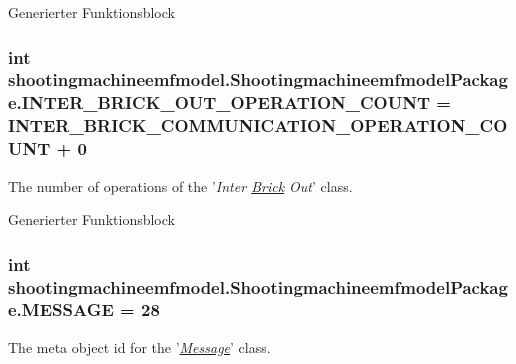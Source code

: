 Generierter Funktionsblock  \hypertarget{interfaceshootingmachineemfmodel_1_1_shootingmachineemfmodel_package_a408e126ab2ebdaf8e342306d21ec4ec9}{
\subsubsection[{I\-N\-T\-E\-R\-\_\-\-B\-R\-I\-C\-K\-\_\-\-O\-U\-T\-\_\-\-O\-P\-E\-R\-A\-T\-I\-O\-N\-\_\-\-C\-O\-U\-N\-T}]{\setlength{\rightskip}{0pt plus 5cm}int shootingmachineemfmodel.\-Shootingmachineemfmodel\-Package.\-I\-N\-T\-E\-R\-\_\-\-B\-R\-I\-C\-K\-\_\-\-O\-U\-T\-\_\-\-O\-P\-E\-R\-A\-T\-I\-O\-N\-\_\-\-C\-O\-U\-N\-T = {\bf I\-N\-T\-E\-R\-\_\-\-B\-R\-I\-C\-K\-\_\-\-C\-O\-M\-M\-U\-N\-I\-C\-A\-T\-I\-O\-N\-\_\-\-O\-P\-E\-R\-A\-T\-I\-O\-N\-\_\-\-C\-O\-U\-N\-T} + 0}}\label{interfaceshootingmachineemfmodel_1_1_shootingmachineemfmodel_package_a408e126ab2ebdaf8e342306d21ec4ec9}
The number of operations of the '{\itshape Inter \hyperlink{interfaceshootingmachineemfmodel_1_1_brick}{Brick} Out}' class.

Generierter Funktionsblock  \hypertarget{interfaceshootingmachineemfmodel_1_1_shootingmachineemfmodel_package_a6cfab10c1d9f4ff2b045b82dabf2fca5}{
\subsubsection[{M\-E\-S\-S\-A\-G\-E}]{\setlength{\rightskip}{0pt plus 5cm}int shootingmachineemfmodel.\-Shootingmachineemfmodel\-Package.\-M\-E\-S\-S\-A\-G\-E = 28}}\label{interfaceshootingmachineemfmodel_1_1_shootingmachineemfmodel_package_a6cfab10c1d9f4ff2b045b82dabf2fca5}
The meta object id for the '\hyperlink{classshootingmachineemfmodel_1_1impl_1_1_message_impl}{{\itshape Message}}' class.

